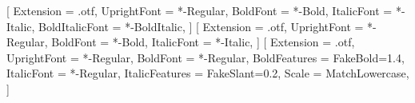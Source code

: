
\usepackage{fontspec}
\usepackage{amsmath}
\usepackage{amsthm}
\usepackage{unicode-math}

\setmainfont{LibertinusSerif}[
  Extension      = .otf,
  UprightFont    = *-Regular,
  BoldFont       = *-Bold,
  ItalicFont     = *-Italic,
  BoldItalicFont = *-BoldItalic,
]
\setsansfont{LibertinusSans}[
  Extension   = .otf,
  UprightFont = *-Regular,
  BoldFont    = *-Bold,
  ItalicFont  = *-Italic,
]
\setmonofont{LibertinusMono}[
  Extension    = .otf,
  UprightFont  = *-Regular,
  BoldFont     = *-Regular,
  BoldFeatures = {FakeBold=1.4},
  ItalicFont   = *-Regular,
  ItalicFeatures = {FakeSlant=0.2},
  Scale        = MatchLowercase,
]

\usepackage[margin=1.1in]{geometry}
\usepackage{microtype}
\setlength{\emergencystretch}{2.5em}
\usepackage{booktabs}
\usepackage{array}
\usepackage{longtable}
\usepackage{enumitem}
\usepackage{xcolor}
\usepackage{graphicx}
\usepackage{mathpartir}
\usepackage{listings}
\usepackage[most]{tcolorbox}
\usepackage{caption}
\usepackage{csquotes}
\usepackage[
  backend=bibtex,
  style=numeric,
  maxbibnames=6,
]{biblatex}
\usepackage[hidelinks,unicode]{hyperref}
\usepackage{cleveref}


